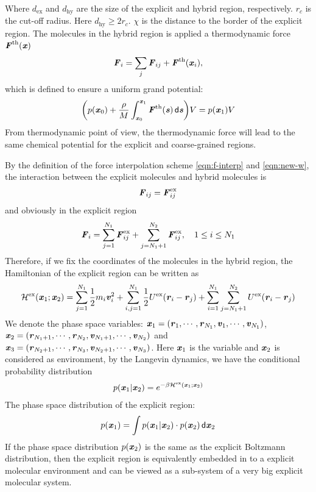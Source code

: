 \documentclass[aps,pre,preprint,unsortedaddress]{revtex4}
\renewcommand{\v}[1]{\textbf{\textit{#1}}}
\renewcommand{\d}[1]{\textsf{#1}}
\begin{document}
Where $d_{\textrm{ex}}$ and $d_{\textrm{hy}}$ are the size of the
explicit and hybrid region, respectively. $r_c$ is the cut-off
radius. Here $d_{\textrm{hy}} \geq 2r_c$. $\chi$ is the distance to
the border of the explicit region.  The molecules in the hybrid region
is applied a thermodynamic force $\v F^{\textrm{th}}(\v x)$
\begin{align}
  \v F_i = \sum_j\v F_{ij} + \v F^{\textrm{th}}(\v x_i),
\end{align}
which is defined to ensure a uniform grand potential:
\begin{align}
  \bigg(
  p(\v x_0) +
  \frac{\rho}{M}\int_{\v x_0}^{\v x_1}\v F^{\textrm{th}}(\v s)\,\d d\v s
  \bigg) V
  =
  p(\v x_1) V
\end{align}
From thermodynamic point of view, the thermodynamic force will lead
to the same chemical potential for the explicit and coarse-grained regions.

By the definition of the force interpolation scheme
\eqref{eqn:f-interp} and \eqref{eqn:new-w}, the interaction between the
explicit molecules and hybrid molecules is
\begin{align}
  \v F_{ij} = \v F^{\textrm{ex}}_{ij}
\end{align}
and obviously in the explicit region
\begin{align}
  \v F_i =
  \sum_{j=1}^{N_1}\v F^{\textrm{ex}}_{ij} + \sum_{j=N_1+1}^{N_2}\v F^{\textrm{ex}}_{ij}, \quad 1\leq i \leq N_1
\end{align}
Therefore, if we fix the coordinates of the molecules in the hybrid
region, the Hamiltonian of the explicit region can be written as
\begin{align}
  \mathcal H^{\textrm{ex}}(\v x_1; \v x_2) =
  \sum_{j=1}^{N_1}\frac12 m_i\v v_i^2 + 
  \sum_{i,j=1}^{N_1}\frac12 U^{\textrm{ex}}(\v r_i - \v r_j) + 
  \sum_{i=1}^{N_1}\sum_{j=N_1+1}^{N_2} U^{\textrm{ex}}(\v r_i - \v r_j) 
\end{align}
We denote the phase space variables: $\v x_1 = (\v r_1, \cdots, \v
r_{N_1}, \v v_1, \cdots, \v v_{N_1})$,  $\v x_2 = (\v r_{N_1+1},
\cdots, \v r_{N_2}, \v v_{N_1+1}, \cdots, \v v_{N_2})$ and
$\v x_3 = (\v r_{N_2+1},
\cdots, \v r_{N_3}, \v v_{N_2+1}, \cdots, \v v_{N_3})$.
Here $\v x_1$ is the variable and $\v x_2$ is considered as environment, 
by the Langevin dynamics, we have the conditional probability distribution
\begin{align}
  p (\v x_1 \vert \v x_2)  =
  e^{-\beta \mathcal H^{\textrm{ex}}(\v x_1; \v x_2)}
\end{align}
The phase space distribution of the explicit region:
\begin{align}
  p(\v x_1) = \int p(\v x_1\vert\v x_2)\cdot p (\v x_2) \,\d d\v x_2
\end{align}
If the phase space distribution $p(\v x_2)$ is the same as the explicit
Boltzmann distribution, then the explicit region is
equivalently embedded in to a explicit molecular environment and can be
viewed as a sub-system of a very big explicit molecular
system.
\end{document}
